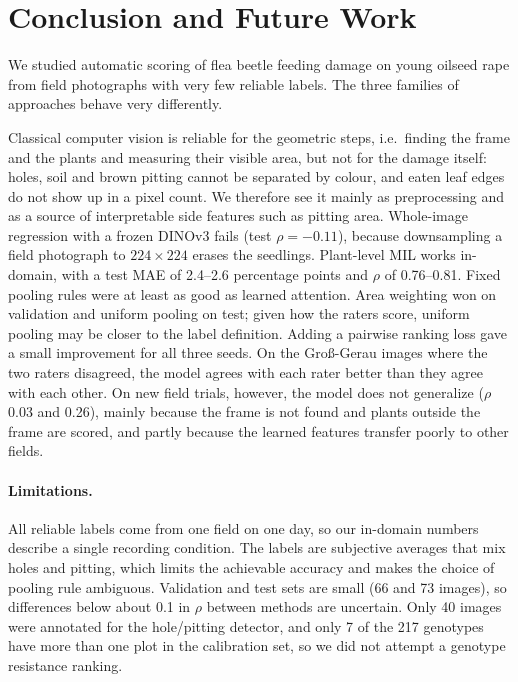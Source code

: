 \section{Conclusion and Future Work}
\label{sec:conclusion}

We studied automatic scoring of flea beetle feeding damage on young oilseed rape from field
photographs with very few reliable labels. The three families of approaches behave very
differently.

Classical computer vision is reliable for the geometric steps, i.e.\ finding the frame and the
plants and measuring their visible area, but not for the damage itself: holes, soil and brown
pitting cannot be separated by colour, and eaten leaf edges do not show up in a pixel count. We
therefore see it mainly as preprocessing and as a source of interpretable side features such as
pitting area. Whole-image regression with a frozen DINOv3 fails (test $\rho = -0.11$), because
downsampling a field photograph to $224\times224$ erases the seedlings. Plant-level MIL works
in-domain, with a test MAE of 2.4--2.6 percentage points and $\rho$ of 0.76--0.81. Fixed pooling
rules were at least as good as learned attention. Area weighting won on validation and uniform
pooling on test; given how the raters score, uniform pooling may be closer to the label
definition. Adding a pairwise ranking loss gave a small improvement for all three seeds.
On the Gro\ss-Gerau images where the two raters disagreed, the model agrees with each rater
better than they agree with each other. On new field trials, however, the model does not
generalize ($\rho$ 0.03 and 0.26), mainly because the frame is not found and plants outside the
frame are scored, and partly because the learned features transfer poorly to other fields.

\paragraph{Limitations.} All reliable labels come from one field on one day, so our in-domain
numbers describe a single recording condition. The labels are subjective averages that mix holes
and pitting, which limits the achievable accuracy and makes the choice of pooling rule ambiguous.
Validation and test sets are small (66 and 73 images), so differences below about 0.1 in $\rho$
between methods are uncertain. Only 40 images were annotated for the hole/pitting detector, and
only 7 of the 217 genotypes have more than one plot in the calibration set, so we did not attempt
a genotype resistance ranking.

